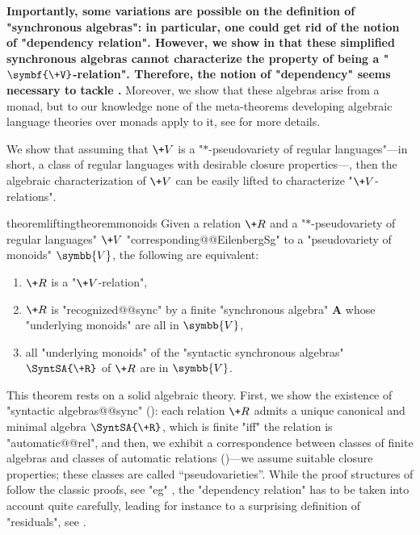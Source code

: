 \textbf{Importantly, some variations are possible on the definition of "synchronous algebras":
in particular, one could get rid of the notion of "dependency relation".
However, we show in  that these
simplified synchronous algebras cannot characterize the property of being a "$\symbf{\+V}$-relation".
Therefore, the notion of "dependency" seems necessary to tackle .}
Moreover, we show that these algebras arise from a monad, but to our knowledge none of the 
meta-theorems developing algebraic language theories over monads apply to it,
see  for more details.

We show that assuming that $\+V$ is a "$*$-pseudovariety of regular languages"---in short, a class of regular languages with desirable closure properties---, then the algebraic characterization of $\+V$ can be easily lifted to characterize "$\+V$-relations".

\begin{restatable*}{theorem}{liftingtheoremmonoids}
	\AP\label{thm:lifting-theorem-monoids}
	Given a relation $\+R$ and a "$\ast$-pseudovariety of regular languages" $\+V$
	"corresponding@@EilenbergSg" to a "pseudovariety of monoids" $\symbb{V}$,
	the following are equivalent:
	\begin{enumerate}
		\item $\+R$ is a "$\+V$-relation",
		\item $\+R$ is "recognized@@sync" by a finite "synchronous algebra" $\mathbf{A}$
			whose "underlying monoids" are all in $\symbb{V}$,
		\item all "underlying monoids" of the "syntactic synchronous algebras" $\SyntSA{\+R}$ of
			$\+R$ are in $\symbb{V}$.
	\end{enumerate} 
\end{restatable*}

This theorem rests on a solid algebraic theory. 
First, we show the existence of "syntactic algebras@@sync" (): 
each relation $\+R$ admits a unique canonical and minimal algebra $\SyntSA{\+R}$, which is finite 
"iff" the relation is "automatic@@rel",
and then, we exhibit a correspondence between classes of finite algebras and classes of
automatic relations ()---we assume suitable closure properties; these classes are called ``pseudovarieties''.
While the proof structures of  follow the classic proofs, see "eg" \cite{Pin2022MathematicalFoundations},
the "dependency relation" has to be taken into account quite carefully, leading for instance
to a surprising definition of "residuals", see .

